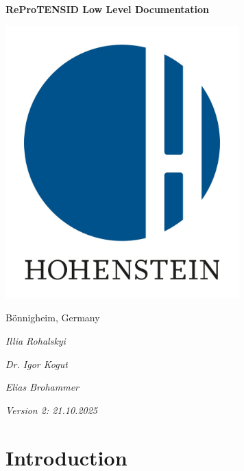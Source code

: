 \documentclass{report}
\begin{document}
\begin{titlepage}
    \centerline{\Huge\textbf{ReProTENSID Low Level Documentation}}
    
    \vspace*{1cm}
    
    \centerline{\includegraphics[width=9cm]{hohenstein logo.jpg}}
    
    \vspace*{1.5cm}
    
    \centerline{\LARGE Bönnigheim, Germany}
    
    \vspace*{1cm}
    
    \centerline{\Large\textit{Illia Rohalskyi}}

    \vspace*{0.2cm}
    
    \centerline{\Large\textit{Dr. Igor Kogut}}

    \vspace*{0.2cm}
    
    \centerline{\Large\textit{Elias Brohammer}}
    
    \vspace*{1cm}
    
    \centerline{\Large\textit{Version 2: 21.10.2025}}
    
\end{titlepage}

\tableofcontents

\chapter{Introduction}
\end{document}
